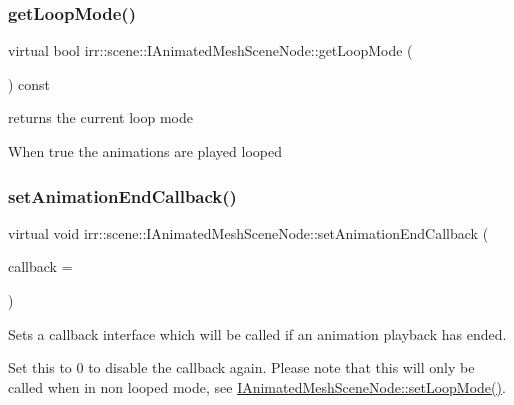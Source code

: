 \subsubsection{\texorpdfstring{get\+Loop\+Mode()}{getLoopMode()}}
{\footnotesize\ttfamily virtual bool irr\+::scene\+::\+I\+Animated\+Mesh\+Scene\+Node\+::get\+Loop\+Mode (\begin{DoxyParamCaption}{ }\end{DoxyParamCaption}) const\hspace{0.3cm}{\ttfamily [pure virtual]}}



returns the current loop mode 

When true the animations are played looped \mbox{\label{classirr_1_1scene_1_1IAnimatedMeshSceneNode_ad688bb5a7654116d1ee823e48393f1bd}} 
\subsubsection{\texorpdfstring{set\+Animation\+End\+Callback()}{setAnimationEndCallback()}}
{\footnotesize\ttfamily virtual void irr\+::scene\+::\+I\+Animated\+Mesh\+Scene\+Node\+::set\+Animation\+End\+Callback (\begin{DoxyParamCaption}\item[{\hyperlink{classirr_1_1scene_1_1IAnimationEndCallBack}{I\+Animation\+End\+Call\+Back} $\ast$}]{callback = {} }\end{DoxyParamCaption})\hspace{0.3cm}{\ttfamily [pure virtual]}}



Sets a callback interface which will be called if an animation playback has ended. 

Set this to 0 to disable the callback again. Please note that this will only be called when in non looped mode, see \hyperlink{classirr_1_1scene_1_1IAnimatedMeshSceneNode_ae6cae051c74c3953061aa9e49e10cd06}{I\+Animated\+Mesh\+Scene\+Node\+::set\+Loop\+Mode()}. \mbox{\label{classirr_1_1scene_1_1IAnimatedMeshSceneNode_a89ef2d20c6e9e83fdb861403c9698c4a}} 
